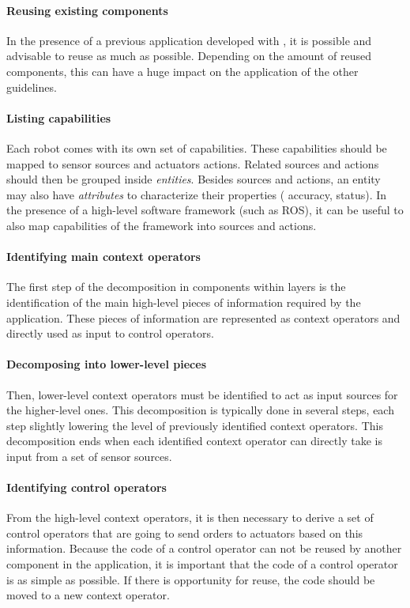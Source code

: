 \paragraph{Reusing existing components}
In the presence of a previous application developed with \diaspec{},
it is possible and advisable to reuse as much as possible. Depending
on the amount of reused components, this can have a huge impact on the
application of the other guidelines.

\paragraph{Listing capabilities}
Each robot comes with its own set of capabilities. These capabilities
should be mapped to sensor sources and actuators actions. Related
sources and actions should then be grouped inside \emph{entities}.
Besides sources and actions, an entity may also have \emph{attributes}
to characterize their properties (\eg{} accuracy, status). In the
presence of a high-level software framework (such as ROS), it can be
useful to also map capabilities of the framework into sources and
actions. 

\paragraph{Identifying main context operators}
The first step of the decomposition in components within layers is the
identification of the main high-level pieces of information required
by the application. These pieces of information are represented as
context operators and directly used as input to control operators.

\paragraph{Decomposing into lower-level pieces}
Then, lower-level context operators must be identified to act as input
sources for the higher-level ones. This decomposition is typically
done in several steps, each step slightly lowering the level of
previously identified context operators. This decomposition ends when
each identified context operator can directly take is input from a set
of sensor sources.

\paragraph{Identifying control operators}
From the high-level context operators, it is then necessary to derive
a set of control operators that are going to send orders to actuators
based on this information. Because the code of a control operator can
not be reused by another component in the application, it is important
that the code of a control operator is as simple as possible. If there
is opportunity for reuse, the code should be moved to a new context
operator.

